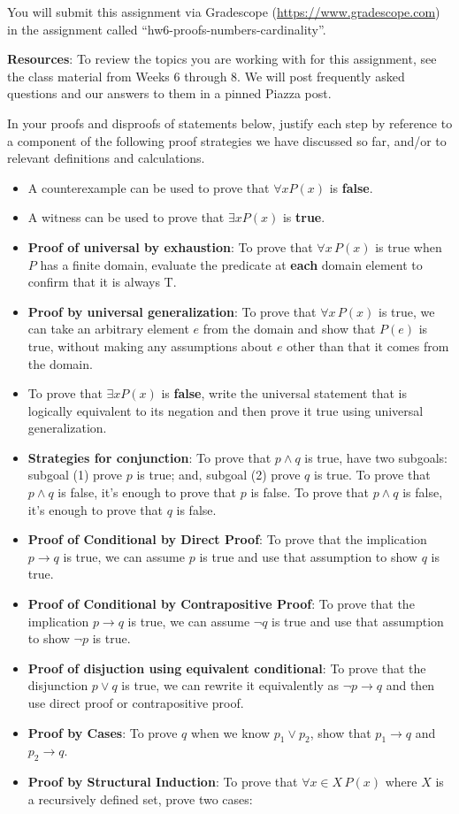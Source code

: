 You will submit this assignment via Gradescope
(\href{https://www.gradescope.com}{https://www.gradescope.com}) 
in the assignment called ``hw6-proofs-numbers-cardinality''.

{\bf Resources}: To review the topics you are working with 
for this assignment, see the class material from Weeks 6 through 8.
We will post frequently asked questions and our answers to them in a 
pinned Piazza post.


In your proofs and disproofs of statements below, justify each  step
by reference to  a component of the  following proof  strategies
we  have discussed so far, and/or to relevant definitions and calculations.
\begin{itemize}
    \item A counterexample can be used to prove that  $\forall x P(x)$ is {\bf false}.
    \item  A witness can be used to prove that  $\exists x P(x)$ is {\bf true}.
    \item {\bf Proof of universal by exhaustion}: To prove that $\forall x \, P(x)$
is true when $P$ has a finite domain, evaluate the predicate at {\bf each} domain element to confirm that it is always T.
    \item  {\bf Proof by universal generalization}: To prove that $\forall x \, P(x)$
is true, we can take an arbitrary element $e$ from the domain and show that $P(e)$ is true, without making any assumptions 
about $e$ other than that it comes from the domain.
    \item To  prove  that $\exists x P(x)$ is {\bf false}, write the universal statement that is 
    logically equivalent to its negation and then prove it true using universal generalization.
    \item {\bf Strategies for conjunction}: To prove that $p \land q$ is true, have two subgoals: 
    subgoal (1) prove $p$ 
is  true; and, subgoal (2) prove $q$ is true. To prove that $p \land q$ is false, it's enough to prove that $p$ is false.
 To prove that $p \land q$ is false, it's enough to prove that $q$ is false.
    \item {\bf Proof of Conditional by Direct Proof}: To prove that the implication $p \to q$ is true, 
    we can assume $p$ is true and use that assumption to show $q$ is true.
    \item {\bf Proof of Conditional by Contrapositive Proof}: To prove that the implication $p \to q$ is true, 
    we can assume $\neg q$ is true and use that assumption to show $\neg p$ is true.
    \item {\bf Proof of disjuction using equivalent conditional}: To prove that the 
    disjunction $p \lor q$ is true, we can rewrite it equivalently as $\lnot p \to q$ and
    then use direct proof or contrapositive proof.
    \item {\bf Proof by Cases}: To prove $q$ when we know $p_1 \lor p_2$, show that $p_1 \to q$ and $p_2 \to q$.
    \item
    {\bf Proof by Structural Induction}: To prove that $\forall x \in X \, P(x)$ where $X$ is a recursively defined set, prove two cases:
        

\end{itemize}
